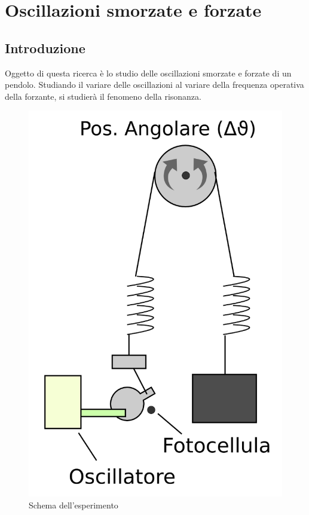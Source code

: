
\chapter{Oscillazioni smorzate e forzate}
\section{Introduzione}

Oggetto di questa ricerca è lo studio delle oscillazioni smorzate e forzate di un pendolo. Studiando il variare delle oscillazioni al variare della frequenza operativa della forzante, si studierà il fenomeno della risonanza.

\begin{figure}
  \begin{center}
\includegraphics[scale=0.7]{../grafici/oscillazioni-schema.png}
  \end{center}
  \caption*{Schema dell'esperimento}
\end{figure}

